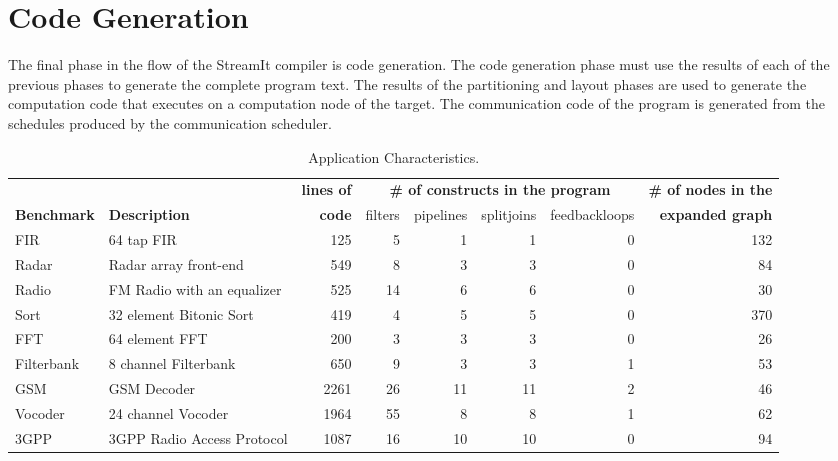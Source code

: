 \section{Code Generation}
\label{sec:codegen}

The final phase in the flow of the StreamIt compiler is code
generation.  The code generation phase must use the results of each of
the previous phases to generate the complete program text.  The
results of the partitioning and layout phases are used to generate the
computation code that executes on a computation node of the target.
The communication code of the program is generated from the schedules
produced by the communication scheduler.

\begin{table*}[t]
\begin{center}
\scriptsize
\begin{tabular}{|l|l||r||r|r|r|r||r|} \hline
 & & {\bf lines of} & \multicolumn{4}{|c||}{\bf \# of constructs in the program} & {\bf \# of nodes in the} \\ \cline{4-7}
{\bf Benchmark} & {\bf Description} & {\bf code} & filters & pipelines & splitjoins & feedbackloops & {\bf expanded graph}
\\
\hline \hline
FIR & 64 tap FIR & 
125 & 5 & 1 & 1 & 0 & 132
\\ \hline
Radar & Radar array front-end\cite{pca} & 
549 & 8 & 3 & 3 & 0 & 84
\\ \hline
Radio & FM Radio with an equalizer & 
525 & 14 & 6 & 6 & 0 & 30
\\ \hline
Sort & 32 element Bitonic Sort & 
419 & 4 & 5 & 5 & 0 & 370
\\  \hline
FFT & 64 element FFT & 
200 & 3 & 3 & 3 & 0 & 26
\\  \hline
Filterbank & 8 channel Filterbank & 
650 & 9 & 3 & 3 & 1 & 53
\\  \hline
GSM & GSM Decoder & 
2261 & 26 & 11 & 11 & 2 & 46
\\ \hline
Vocoder & 24 channel Vocoder &  
1964 & 55 & 8 & 8 & 1 & 62
\\ \hline
3GPP & 3GPP Radio Access Protocol &  
1087 & 16 & 10 & 10 & 0 & 94
\\ \hline
\hline
\end{tabular}
\vspace{-6pt}
\caption{\protect\small Application Characteristics.}
\label{tab:benchmarks}
\vspace{-12pt}
\end{center}
\end{table*}

